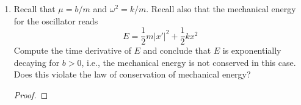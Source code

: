 \documentclass[../psets.tex]{subfiles}
\begin{document}
\begin{enumerate}
\begin{enumerate}
\begin{proof}
            which we can solve for $A,B$, yielding
            \begin{equation*}
                \begin{cases}
                    A = \frac{x_1-x_0c_2}{c_1-c_2}\\
                    B = \frac{x_0c_1-x_1}{c_1-c_2}
                \end{cases}
            \end{equation*}
            Therefore, our final particular solution is
            \begin{equation*}
                \boxed{x(t) = \frac{x_1-x_0c_2}{c_1-c_2}\e[c_1t]+\frac{x_0c_1-x_1}{c_1-c_2}\e[c_2t]}
            \end{equation*}
        \end{proof}
        \item Recall that $\mu=b/m$ and $\omega^2=k/m$. Recall also that the mechanical energy for the oscillator reads
        \begin{equation*}
            E = \frac{1}{2}m|x'|^2+\frac{1}{2}kx^2
        \end{equation*}
        Compute the time derivative of $E$ and conclude that $E$ is exponentially decaying for $b>0$, i.e., the mechanical energy is not conserved in this case. Does this violate the law of conservation of mechanical energy?
        \begin{proof}



\end{proof}
\end{enumerate}
\end{enumerate}
\end{document}
